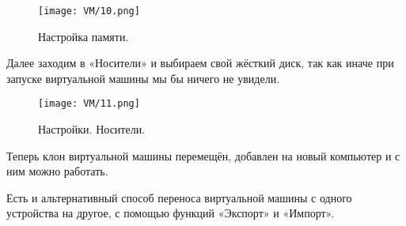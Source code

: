 \begin{figure}[h]
		\centering
		\texttt{[image: VM/10.png]}
\caption{Настройка памяти.}
\label{ris:image}
\end{figure}

\quad Далее заходим в «Носители» и выбираем свой жёсткий диск, так как иначе при запуске виртуальной машины мы бы ничего не увидели.

\begin{figure}[h]
		\centering
		\texttt{[image: VM/11.png]}
\caption{Настройки. Носители.}
\label{ris:image}
\end{figure}

\quad Теперь клон виртуальной машины перемещён, добавлен на новый компьютер и с ним можно работать.

\quad Есть и альтернативный способ переноса виртуальной машины с одного устройства на другое, с помощью функций «Экспорт» и «Импорт».

